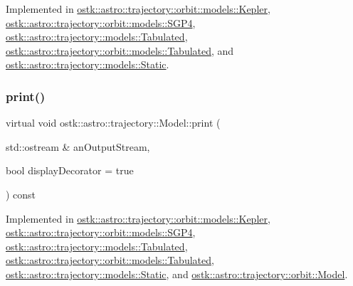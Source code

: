Implemented in \hyperlink{classostk_1_1astro_1_1trajectory_1_1orbit_1_1models_1_1_kepler_ad2a61eb0cbd9887fc2180dc0818c209e}{ostk\+::astro\+::trajectory\+::orbit\+::models\+::\+Kepler}, \hyperlink{classostk_1_1astro_1_1trajectory_1_1orbit_1_1models_1_1_s_g_p4_ad51d979b8b9b37251b6381cfe9df55ea}{ostk\+::astro\+::trajectory\+::orbit\+::models\+::\+S\+G\+P4}, \hyperlink{classostk_1_1astro_1_1trajectory_1_1models_1_1_tabulated_a9d206aee35ebabe4b36ddfc057142f16}{ostk\+::astro\+::trajectory\+::models\+::\+Tabulated}, \hyperlink{classostk_1_1astro_1_1trajectory_1_1orbit_1_1models_1_1_tabulated_abd72010cb413d8479c097376bfebaf56}{ostk\+::astro\+::trajectory\+::orbit\+::models\+::\+Tabulated}, and \hyperlink{classostk_1_1astro_1_1trajectory_1_1models_1_1_static_a0ef36b672baa80f522135d86f3b6bb9c}{ostk\+::astro\+::trajectory\+::models\+::\+Static}.

\mbox{\label{classostk_1_1astro_1_1trajectory_1_1_model_a4b2098483430a820481ed50b81656e31}} 
\subsubsection{\texorpdfstring{print()}{print()}}
{\footnotesize\ttfamily virtual void ostk\+::astro\+::trajectory\+::\+Model\+::print (\begin{DoxyParamCaption}\item[{std\+::ostream \&}]{an\+Output\+Stream,  }\item[{bool}]{display\+Decorator = {\ttfamily true} }\end{DoxyParamCaption}) const\hspace{0.3cm}{\ttfamily [pure virtual]}}



Implemented in \hyperlink{classostk_1_1astro_1_1trajectory_1_1orbit_1_1models_1_1_kepler_a9c71803234f356ade03453e3ae19ae94}{ostk\+::astro\+::trajectory\+::orbit\+::models\+::\+Kepler}, \hyperlink{classostk_1_1astro_1_1trajectory_1_1orbit_1_1models_1_1_s_g_p4_a12416476201382c3d1e3c620f7be106a}{ostk\+::astro\+::trajectory\+::orbit\+::models\+::\+S\+G\+P4}, \hyperlink{classostk_1_1astro_1_1trajectory_1_1models_1_1_tabulated_a330bfffa50eb77eb7f6d45cfec1e9e29}{ostk\+::astro\+::trajectory\+::models\+::\+Tabulated}, \hyperlink{classostk_1_1astro_1_1trajectory_1_1orbit_1_1models_1_1_tabulated_a66be3f1f23a464c666c38a3adcc3bab5}{ostk\+::astro\+::trajectory\+::orbit\+::models\+::\+Tabulated}, \hyperlink{classostk_1_1astro_1_1trajectory_1_1models_1_1_static_aae663f763324f081911ea47070c9f79f}{ostk\+::astro\+::trajectory\+::models\+::\+Static}, and \hyperlink{classostk_1_1astro_1_1trajectory_1_1orbit_1_1_model_a8ea45c1a6e51a6153ce3f72f5294f0c6}{ostk\+::astro\+::trajectory\+::orbit\+::\+Model}.



